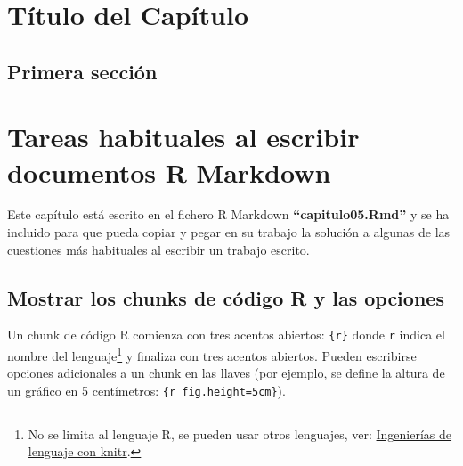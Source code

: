 \documentclass[12pt,a4paper,oneside,]{book}
\def\ifdoblecara{} %
\let\ifdoblecara\undefined %
\def\ifprincipal{} %
\let\rmarkdownfootnote\footnote%
\def\footnote{\protect\rmarkdownfootnote}
\numberwithin{dummy}{section}
\theoremstyle{ocrenumbox}
\theoremstyle{blacknumex}
\theoremstyle{blacknumbox}
\theoremstyle{ocrenum}
\theoremstyle{ocrenum}
\begin{document}
\hypertarget{tuxedtulo-del-capuxedtulo-3}{%
\chapter{Título del Capítulo}\label{tuxedtulo-del-capuxedtulo-3}}

\hypertarget{primera-secciuxf3n-3}{%
\section{Primera sección}\label{primera-secciuxf3n-3}}

\FloatBarrier

\ifdefined\ifprincipal
\else
\setlength{\parindent}{1em}
\pagestyle{fancy}
\setcounter{tocdepth}{4}
\tableofcontents

\nocite{Luque2017,Luque2019,RStudio,R-base2,
R-knitr,R-rmarkdown,R-dplyr,R-ggplot2,Techopedia}

\fi

\ifdefined\ifdoblecara
\fancyhead{}{}
\fancyhead[LE,RO]{\scriptsize\rightmark}
\fancyfoot[LO,RE]{\scriptsize\slshape \leftmark}
\fancyfoot[C]{}
\fancyfoot[LE,RO]{\footnotesize\thepage}
\else
\fancyhead{}{}
\fancyhead[RO]{\scriptsize\rightmark}
\fancyfoot[LO]{\scriptsize\slshape \leftmark}
\fancyfoot[C]{}
\fancyfoot[RO]{\footnotesize\thepage}
\fi

\renewcommand{\headrulewidth}{0.4pt}
\renewcommand{\footrulewidth}{0.4pt}

\hypertarget{tareas-habituales-al-escribir-documentos-r-markdown}{%
\chapter{Tareas habituales al escribir documentos R
Markdown}\label{tareas-habituales-al-escribir-documentos-r-markdown}}

Este capítulo está escrito en el fichero R Markdown
\textbf{``capitulo05.Rmd''} y se ha incluido para que pueda copiar y
pegar en su trabajo la solución a algunas de las cuestiones más
habituales al escribir un trabajo escrito.

\hypertarget{mostrar-los-chunks-de-cuxf3digo-r-y-las-opciones}{%
\section{Mostrar los chunks de código R y las
opciones}\label{mostrar-los-chunks-de-cuxf3digo-r-y-las-opciones}}

Un chunk de código R comienza con tres acentos abiertos:
\texttt{\textasciigrave{}\textasciigrave{}\textasciigrave{}\{r\}} donde
\texttt{r} indica el nombre del lenguaje\footnote{No se limita al
  lenguaje R, se pueden usar otros lenguajes, ver:
  \href{https://rmarkdown.rstudio.com/authoring_knitr_engines.html\%23sql}{Ingenierías
  de lenguaje con knitr}.} y finaliza con tres acentos abiertos. Pueden
escribirse opciones adicionales a un chunk en las llaves (por ejemplo,
se define la altura de un gráfico en 5 centímetros:
\texttt{\textasciigrave{}\textasciigrave{}\textasciigrave{}\{r\ fig.height=\textquotesingle{}5cm\textquotesingle{}\}}).
\end{document}
